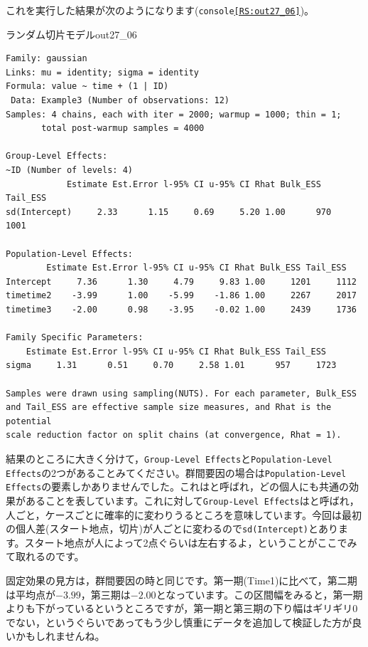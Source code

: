 \documentclass{ltjbook}
\begin{document}
これを実行した結果が次のようになります(\texttt{console\ref{RS:out27_06}})。
\begin{Rscreen}{ランダム切片モデル}{out27_06}
    \begin{verbatim}
Family: gaussian 
Links: mu = identity; sigma = identity 
Formula: value ~ time + (1 | ID) 
 Data: Example3 (Number of observations: 12) 
Samples: 4 chains, each with iter = 2000; warmup = 1000; thin = 1;
       total post-warmup samples = 4000

Group-Level Effects: 
~ID (Number of levels: 4) 
            Estimate Est.Error l-95% CI u-95% CI Rhat Bulk_ESS Tail_ESS
sd(Intercept)     2.33      1.15     0.69     5.20 1.00      970     1001

Population-Level Effects: 
        Estimate Est.Error l-95% CI u-95% CI Rhat Bulk_ESS Tail_ESS
Intercept     7.36      1.30     4.79     9.83 1.00     1201     1112
timetime2    -3.99      1.00    -5.99    -1.86 1.00     2267     2017
timetime3    -2.00      0.98    -3.95    -0.02 1.00     2439     1736

Family Specific Parameters: 
    Estimate Est.Error l-95% CI u-95% CI Rhat Bulk_ESS Tail_ESS
sigma     1.31      0.51     0.70     2.58 1.01      957     1723

Samples were drawn using sampling(NUTS). For each parameter, Bulk_ESS
and Tail_ESS are effective sample size measures, and Rhat is the potential
scale reduction factor on split chains (at convergence, Rhat = 1).
\end{verbatim}
\end{Rscreen}
結果のところに大きく分けて，\texttt{Group-Level Effects}と\texttt{Population-Level Effects}の2つがあることみてください。群間要因の場合は\texttt{Population-Level Effects}の要素しかありませんでした。これはと呼ばれ，どの個人にも共通の効果があることを表しています。これに対して\texttt{Group-Level Effects}はと呼ばれ，人ごと，ケースごとに確率的に変わりうるところを意味しています。今回は最初の個人差(スタート地点，切片)が人ごとに変わるので\texttt{sd(Intercept)}とあります。スタート地点が人によって2点ぐらいは左右するよ，ということがここでみて取れるのです。

固定効果の見方は，群間要因の時と同じです。第一期(Time1)に比べて，第二期は平均点が$-3.99$，第三期は$-2.00$となっています。この区間幅をみると，第一期よりも下がっているというところですが，第一期と第三期の下り幅はギリギリ0でない，というぐらいであってもう少し慎重にデータを追加して検証した方が良いかもしれませんね。\\
\end{document}
